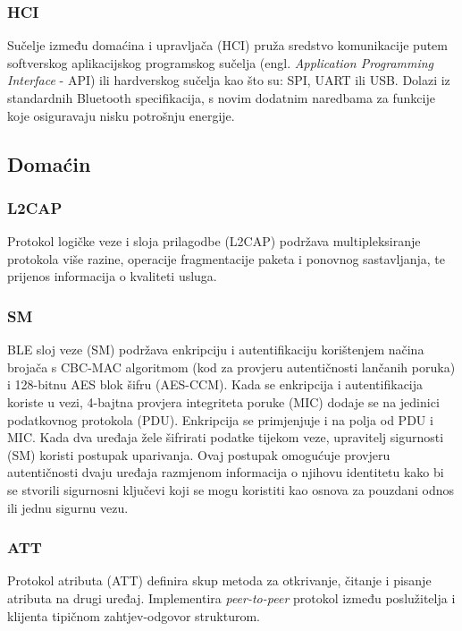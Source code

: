 \subsubsection{HCI}
Sučelje između domaćina i upravljača (HCI) pruža sredstvo komunikacije putem softverskog aplikacijskog programskog sučelja (engl. \textit{Application Programming Interface} - API) ili hardverskog sučelja kao što su: SPI, UART ili USB. Dolazi iz standardnih Bluetooth specifikacija, s novim dodatnim naredbama za funkcije koje osiguravaju nisku potrošnju energije.

\subsection{Domaćin}

\subsubsection{L2CAP}
Protokol logičke veze i sloja prilagodbe (L2CAP) podržava multipleksiranje protokola više razine, operacije fragmentacije paketa i ponovnog sastavljanja, te prijenos informacija o kvaliteti usluga.

\subsubsection{SM}
BLE sloj veze (SM) podržava enkripciju i autentifikaciju korištenjem načina brojača s CBC-MAC algoritmom (kod za provjeru autentičnosti lančanih poruka) i 128-bitnu AES blok šifru (AES-CCM). Kada se enkripcija i autentifikacija koriste u vezi, 4-bajtna provjera integriteta poruke (MIC) dodaje se na jedinici podatkovnog protokola (PDU). Enkripcija se primjenjuje i na polja od PDU i MIC. Kada dva uređaja žele šifrirati podatke tijekom veze, upravitelj sigurnosti (SM) koristi postupak uparivanja. Ovaj postupak omogućuje provjeru autentičnosti dvaju uređaja razmjenom informacija o njihovu identitetu kako bi se stvorili sigurnosni ključevi koji se mogu koristiti kao osnova za pouzdani odnos ili jednu sigurnu vezu. 

\subsubsection{ATT}
Protokol atributa (ATT) definira skup metoda za otkrivanje, čitanje i pisanje atributa na drugi uređaj. Implementira \textit{peer-to-peer} protokol između poslužitelja i klijenta tipičnom zahtjev-odgovor strukturom. 


